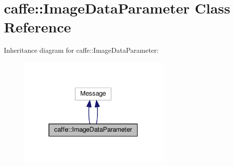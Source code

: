 \hypertarget{classcaffe_1_1_image_data_parameter}{}\section{caffe\+:\+:Image\+Data\+Parameter Class Reference}
\label{classcaffe_1_1_image_data_parameter}


Inheritance diagram for caffe\+:\+:Image\+Data\+Parameter\+:
\nopagebreak
\begin{figure}[H]
\begin{center}
\leavevmode
\includegraphics[width=217pt]{classcaffe_1_1_image_data_parameter__inherit__graph}
\end{center}
\end{figure}
